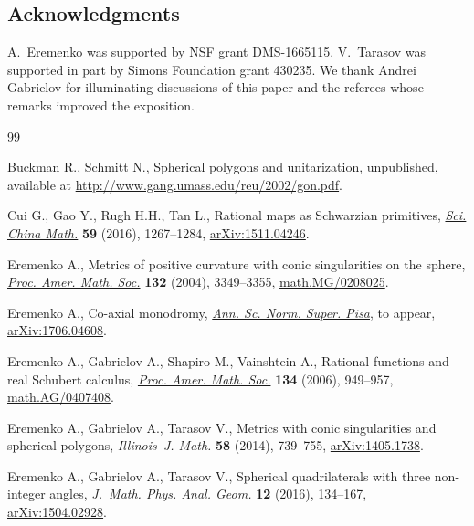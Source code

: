 \documentclass[pdftex]{sigma}
\numberwithin{equation}{section}
\begin{document}
\subsection*{Acknowledgments}

A.~Eremenko was supported by NSF grant DMS-1665115. V.~Tarasov was supported in part by Simons Foundation grant 430235. We thank Andrei Gabrielov for illuminating discussions of this paper and the referees whose remarks improved the exposition.

\begin{thebibliography}{99}
\footnotesize\itemsep=0pt

Buckman R., Schmitt N., Spherical polygons and unitarization, {u}npublished,
 available at \url{http://www.gang.umass.edu/reu/2002/gon.pdf}.

Cui G., Gao Y., Rugh H.H., Tan L., Rational maps as {S}chwarzian primitives,
 \href{https://doi.org/10.1007/s11425-016-5140-7}{\textit{Sci. China Math.}} \textbf{59} (2016), 1267--1284,
 \href{https://arxiv.org/abs/1511.04246}{arXiv:1511.04246}.

Eremenko A., Metrics of positive curvature with conic singularities on the
 sphere, \href{https://doi.org/10.1090/S0002-9939-04-07439-8}{\textit{Proc. Amer. Math. Soc.}} \textbf{132} (2004), 3349--3355,
 \href{https://arxiv.org/abs/math.MG/0208025}{math.MG/0208025}.

Eremenko A., Co-axial monodromy, \href{https://doi.org/10.2422/2036-2145.201706_022}{\textit{Ann. Sc. Norm. Super. Pisa}}, {t}o
 appear, \href{https://arxiv.org/abs/1706.04608}{arXiv:1706.04608}.

Eremenko A., Gabrielov A., Shapiro M., Vainshtein A., Rational functions and
 real {S}chubert calculus, \href{https://doi.org/10.1090/S0002-9939-05-08048-2}{\textit{Proc. Amer. Math. Soc.}} \textbf{134}
 (2006), 949--957, \href{https://arxiv.org/abs/math.AG/0407408}{math.AG/0407408}.

Eremenko A., Gabrielov A., Tarasov V., Metrics with conic singularities and
 spherical polygons, \textit{Illinois~J. Math.} \textbf{58} (2014), 739--755,
 \href{https://arxiv.org/abs/1405.1738}{arXiv:1405.1738}.

Eremenko A., Gabrielov A., Tarasov V., Spherical quadrilaterals with three
 non-integer angles, \href{https://doi.org/10.15407/mag12.02.134}{\textit{J.~Math. Phys. Anal. Geom.}} \textbf{12} (2016),
 134--167, \href{https://arxiv.org/abs/1504.02928}{arXiv:1504.02928}.


\end{thebibliography}
\end{document}
